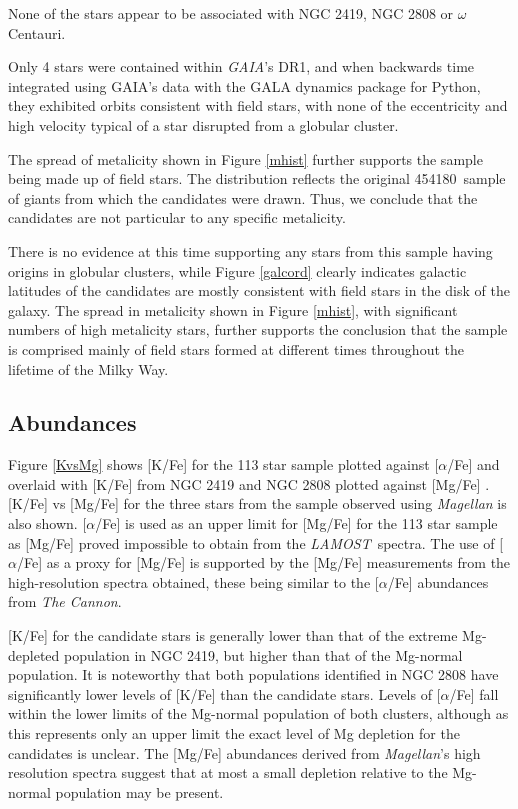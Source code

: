 \documentclass[a4paper,fleqn,usenatbib]{mnras}
\newcommand{\LamostGiants}{454180}
\newcommand{\project}[1]{\emph{#1}}
\newcommand{\lamost}{\project{LAMOST}}
\newcommand{\tc}{\project{The Cannon}}
\begin{document}
None of the stars appear to be associated with NGC 2419, NGC 2808 or $\omega$ Centauri.

Only 4 stars were contained within \textit{GAIA}'s DR1, and when backwards time integrated using GAIA's data with the GALA dynamics package for Python, they exhibited orbits consistent with field stars, with none of the eccentricity and high velocity typical of a star disrupted from a globular cluster.

The spread of metalicity shown in Figure \ref{mhist} further supports the sample being made up of field stars. The distribution reflects the original \LamostGiants \ sample of giants from which the candidates were drawn. Thus, we conclude that the candidates are not particular to any specific metalicity.

There is no evidence at this time supporting any stars from this sample having origins in globular clusters, while Figure \ref{galcord} clearly indicates galactic latitudes of the candidates are mostly consistent with field stars in the disk of the galaxy. The spread in metalicity shown in Figure \ref{mhist}, with significant numbers of high metalicity stars, further supports the conclusion that the sample is comprised mainly of field stars formed at different times throughout the lifetime of the Milky Way.



\subsection{Abundances}

Figure \ref{KvsMg} shows [K/Fe]  for the 113 star sample plotted against $[\alpha$/Fe] and overlaid with [K/Fe] from NGC 2419 and NGC 2808 plotted against [Mg/Fe] \citep{cohenkirby2012,mucciarelli2012,mucciarelli2015}. [K/Fe] vs [Mg/Fe] for the three stars from the sample observed using \textit{Magellan} is also shown. $[\alpha$/Fe] is used as an upper limit for [Mg/Fe] for the 113 star sample as [Mg/Fe] proved impossible to obtain from the \lamost \ spectra. The use of [$\alpha$/Fe] as a proxy for [Mg/Fe] is supported by the [Mg/Fe] measurements from the high-resolution spectra obtained, these being similar to the [$\alpha$/Fe] abundances from \tc.

[K/Fe] for the candidate stars is generally lower than that of the extreme Mg-depleted population in NGC 2419, but higher than that of the Mg-normal population. It is noteworthy that both populations identified in NGC 2808 have significantly lower levels of [K/Fe] than the candidate stars.
Levels of [$\alpha$/Fe] fall within the lower limits of the Mg-normal population of both clusters, although as this represents only an upper limit the exact level of Mg depletion for the candidates is unclear. The [Mg/Fe] abundances derived from \textit{Magellan}'s high resolution spectra suggest that at most a small depletion relative to the Mg-normal population may be present.
\end{document}
